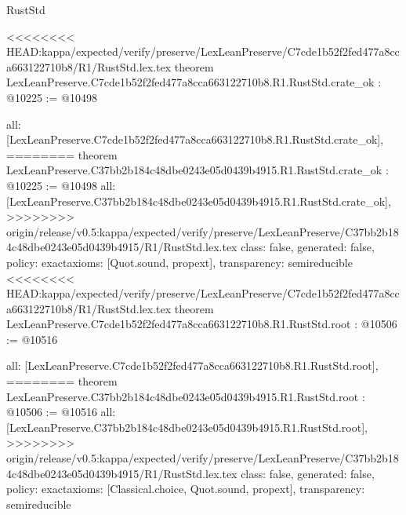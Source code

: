 \begin{lexlean}{RustStd}
\begin{coremodule}
{\begin{coremodule}
{{{{{{{{{{{{{{}
<<<<<<<< HEAD:kappa/expected/verify/preserve/LexLeanPreserve/C7cde1b52f2fed477a8cca663122710b8/R1/RustStd.lex.tex
theorem LexLeanPreserve.C7cde1b52f2fed477a8cca663122710b8.R1.RustStd.crate_ok : @10225 := @10498 {
  all: [LexLeanPreserve.C7cde1b52f2fed477a8cca663122710b8.R1.RustStd.crate_ok],
========
theorem LexLeanPreserve.C37bb2b184c48dbe0243e05d0439b4915.R1.RustStd.crate_ok : @10225 := @10498 {
  all: [LexLeanPreserve.C37bb2b184c48dbe0243e05d0439b4915.R1.RustStd.crate_ok],
>>>>>>>> origin/release/v0.5:kappa/expected/verify/preserve/LexLeanPreserve/C37bb2b184c48dbe0243e05d0439b4915/R1/RustStd.lex.tex
  class: false,
  generated: false,
  policy: exact{axioms: [Quot.sound, propext]},
  transparency: semireducible
}
<<<<<<<< HEAD:kappa/expected/verify/preserve/LexLeanPreserve/C7cde1b52f2fed477a8cca663122710b8/R1/RustStd.lex.tex
theorem LexLeanPreserve.C7cde1b52f2fed477a8cca663122710b8.R1.RustStd.root : @10506 := @10516 {
  all: [LexLeanPreserve.C7cde1b52f2fed477a8cca663122710b8.R1.RustStd.root],
========
theorem LexLeanPreserve.C37bb2b184c48dbe0243e05d0439b4915.R1.RustStd.root : @10506 := @10516 {
  all: [LexLeanPreserve.C37bb2b184c48dbe0243e05d0439b4915.R1.RustStd.root],
>>>>>>>> origin/release/v0.5:kappa/expected/verify/preserve/LexLeanPreserve/C37bb2b184c48dbe0243e05d0439b4915/R1/RustStd.lex.tex
  class: false,
  generated: false,
  policy: exact{axioms: [Classical.choice, Quot.sound, propext]},
  transparency: semireducible
}

}}}}}}}}}}}}}}}
\end{coremodule}}
\end{coremodule}
\end{lexlean}
